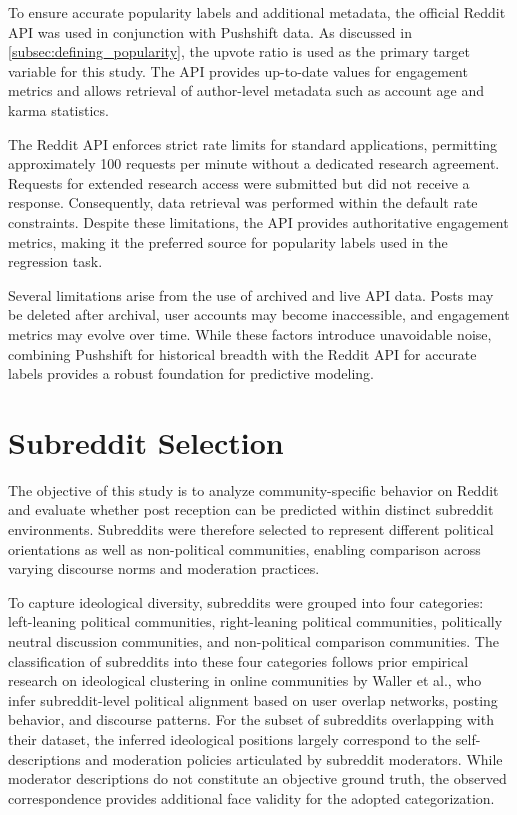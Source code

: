 To ensure accurate popularity labels and additional metadata, the official Reddit API was used in conjunction with Pushshift data. As discussed in \autoref{subsec:defining_popularity}, the upvote ratio is used as the primary target variable for this study. The API provides up-to-date values for engagement metrics and allows retrieval of author-level metadata such as account age and karma statistics.

The Reddit API enforces strict rate limits for standard applications, permitting approximately 100 requests per minute without a dedicated research agreement. Requests for extended research access were submitted but did not receive a response. Consequently, data retrieval was performed within the default rate constraints. Despite these limitations, the API provides authoritative engagement metrics, making it the preferred source for popularity labels used in the regression task.

Several limitations arise from the use of archived and live API data. Posts may be deleted after archival, user accounts may become inaccessible, and engagement metrics may evolve over time. While these factors introduce unavoidable noise, combining Pushshift for historical breadth with the Reddit API for accurate labels provides a robust foundation for predictive modeling.

\section{Subreddit Selection}
\label{sec:subreddit_selection}

The objective of this study is to analyze community-specific behavior on Reddit and evaluate whether post reception can be predicted within distinct subreddit environments. Subreddits were therefore selected to represent different political orientations as well as non-political communities, enabling comparison across varying discourse norms and moderation practices.

To capture ideological diversity, subreddits were grouped into four categories: left-leaning political communities, right-leaning political communities, politically neutral discussion communities, and non-political comparison communities. The classification of subreddits into these four categories follows prior empirical research on ideological clustering in online communities by Waller et al.\cite{waller2021quantifying}, who infer subreddit-level political alignment based on user overlap networks, posting behavior, and discourse patterns. For the subset of subreddits overlapping with their dataset, the inferred ideological positions largely correspond to the self-descriptions and moderation policies articulated by subreddit moderators. While moderator descriptions do not constitute an objective ground truth, the observed correspondence provides additional face validity for the adopted categorization.

